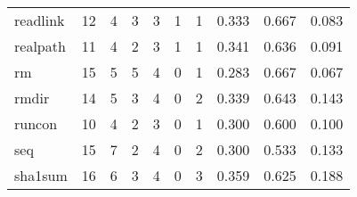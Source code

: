 \begin{longtable}{lp{2.0cm}p{2.0cm}p{2.0cm}p{2.0cm}p{2.0cm}p{2.0cm}p{2.0cm}p{2.0cm}p{2.0cm}}
readlink  &                     12 &                                             4 &                                            3 &                                           3 &                                            1 &                                          1 &                                0.333 &                                  0.667 &                                0.083 \\
realpath  &                     11 &                                             4 &                                            2 &                                           3 &                                            1 &                                          1 &                                0.341 &                                  0.636 &                                0.091 \\
rm        &                     15 &                                             5 &                                            5 &                                           4 &                                            0 &                                          1 &                                0.283 &                                  0.667 &                                0.067 \\
rmdir     &                     14 &                                             5 &                                            3 &                                           4 &                                            0 &                                          2 &                                0.339 &                                  0.643 &                                0.143 \\
runcon    &                     10 &                                             4 &                                            2 &                                           3 &                                            0 &                                          1 &                                0.300 &                                  0.600 &                                0.100 \\
seq       &                     15 &                                             7 &                                            2 &                                           4 &                                            0 &                                          2 &                                0.300 &                                  0.533 &                                0.133 \\
sha1sum   &                     16 &                                             6 &                                            3 &                                           4 &                                            0 &                                          3 &                                0.359 &                                  0.625 &                                0.188 \\

\end{longtable}
